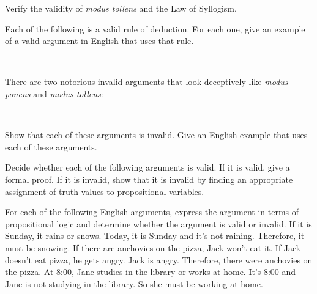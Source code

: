 \begin{exercises}

\problem Verify the validity of \textit{modus tollens} and the Law of
Syllogism.

\problem Each of the following is a valid rule of deduction.
For each one, give an example of a valid argument in English that
uses that rule.
\begin{center}
\mbox{\qquad
{}\qquad
{}\qquad
{}\qquad
{}
}
\end{center}

\problem There are two notorious invalid arguments that look
deceptively like \textit{modus ponens} and \textit{modus tollens}:
\begin{center}
\mbox{\qquad
{}\qquad
{}\qquad
}
\end{center}
Show that each of these arguments is invalid.  Give an English
example that uses each of these arguments.

\problem Decide whether each of the following arguments is valid.
If it is valid, give a formal proof.  If it is invalid, show that
it is invalid by finding an appropriate assignment of truth values
to propositional variables.
\smallskip
{}


\problem For each of the following English arguments, express the
argument in terms of propositional logic and determine whether the
argument is valid or invalid.
\ppart If it is Sunday, it rains or snows.  Today, it is Sunday
and it's not raining.  Therefore, it must be snowing.
\ppart If there are anchovies on the pizza, Jack won't eat it.
If Jack doesn't eat pizza, he gets angry.  Jack is angry.
Therefore, there were anchovies on the pizza.
\ppart At 8:00, Jane studies in the library or works at home.
It's 8:00 and Jane is not studying in the library.  So she must
be working at home.



\end{exercises}





